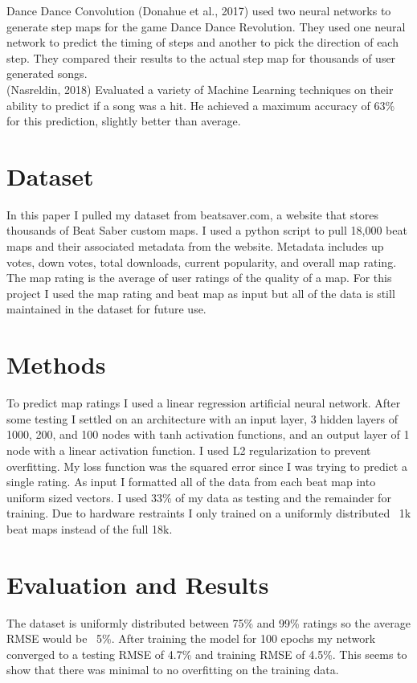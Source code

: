 \documentclass[12pt]{scrartcl}
\begin{document}
	Dance Dance Convolution (Donahue et al., 2017) used two neural networks to generate step maps for the game Dance Dance Revolution. They used one neural network to predict the timing of steps and another to pick the direction of each step. They compared their results to the actual step map for thousands of user generated songs. \\
	
	(Nasreldin, 2018) Evaluated a variety of Machine Learning techniques on their ability to predict if a song was a hit. He achieved a maximum accuracy of 63\% for this prediction, slightly better than average.

	\section{Dataset}
	In this paper I pulled my dataset from beatsaver.com, a website that stores thousands of Beat Saber custom maps. I used a python script to pull 18,000 beat maps and their associated metadata from the website. Metadata includes up votes, down votes, total downloads, current popularity, and overall map rating. The map rating is the average of user ratings of the quality of a map. For this project I used the map rating and beat map as input but all of the data is still maintained in the dataset for future use.

	\section{Methods}
	To predict map ratings I used a linear regression artificial neural network. After some testing I settled on an architecture with an input layer, 3 hidden layers of 1000, 200, and 100 nodes with tanh activation functions, and an output layer of 1 node with a linear activation function. I used L2 regularization to prevent overfitting. My loss function was the squared error since I was trying to predict a single rating. As input I formatted all of the data from each beat map into uniform sized vectors. I used 33\% of my data as testing and the remainder for training. Due to hardware restraints I only trained on a uniformly distributed ~1k beat maps instead of the full 18k.

	\section{Evaluation and Results}
	The dataset is uniformly distributed between 75\% and 99\% ratings so the average RMSE would be ~5\%. After training the model for 100 epochs my network converged to a testing RMSE of 4.7\% and training RMSE of 4.5\%. This seems to show that there was minimal to no overfitting on the training data. 
\end{document}
